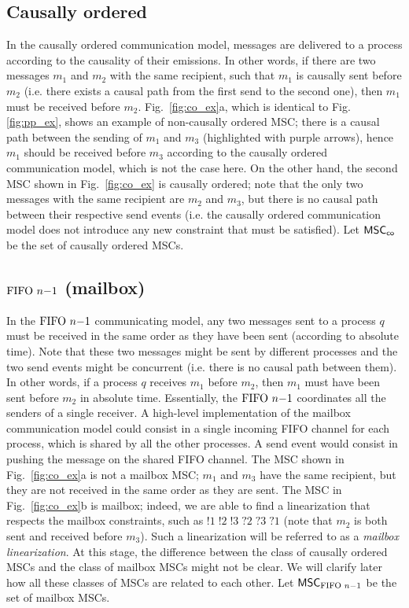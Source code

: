 \subsection{Causally ordered}
In the causally ordered communication model, messages are delivered to a process according to the causality of their emissions. In other words, if there are two messages $m_1$ and $m_2$ with the same recipient, such that $m_1$ is causally sent before $m_2$ (i.e. there exists a causal path from the first send to the second one), then $m_1$ must be received before $m_2$. Fig.~\ref{fig:co_ex}a, which is identical to Fig.\ref{fig:pp_ex}, shows an example of non-causally ordered MSC; there is a causal path between the sending of $m_1$ and $m_3$ (highlighted with purple arrows), hence $m_1$ should be received before $m_3$ according to the causally ordered communication model, which is not the case here. On the other hand, the second MSC shown in Fig.~\ref{fig:co_ex} is causally ordered; note that the only two messages with the same recipient are $m_2$ and $m_3$, but there is no causal path between their respective send events (i.e. the causally ordered communication model does not introduce any new constraint that must be satisfied). Let $\mathsf{MSC}_{\mathsf{co}}$ be the set of causally ordered MSCs.



\subsection{$\text{FIFO } n\mathsf{-}1$ (mailbox)}
In the $\text{FIFO } n\mathsf{-}1$ communicating model, any two messages sent to a process $q$ must be received in the same order as they have been sent (according to absolute time). Note that these two messages might be sent by different processes and the two send events might be concurrent (i.e. there is no causal path between them). In other words, if a process $q$ receives $m_1$ before $m_2$, then $m_1$ must have been sent before $m_2$ in absolute time. Essentially, the $\text{FIFO } n\mathsf{-}1$ coordinates all the senders of a single receiver. A high-level implementation of the mailbox communication model could consist in a single incoming FIFO channel for each process, which is shared by all the other processes. A send event would consist in pushing the message on the shared FIFO channel. The MSC shown in Fig.~\ref{fig:co_ex}a is not a mailbox MSC; $m_1$ and $m_3$ have the same recipient, but they are not received in the same order as they are sent. The MSC in Fig.~\ref{fig:co_ex}b is mailbox; indeed, we are able to find a linearization that respects the mailbox constraints, such as $!1\;!2\;!3\;?2\;?3\;?1$ (note that $m_2$ is both sent and received before $m_3$). Such a linearization will be referred to as a \emph{mailbox linearization}. At this stage, the difference between the class of causally ordered MSCs and the class of mailbox MSCs might not be clear. We will clarify later how all these classes of MSCs are related to each other. Let $\mathsf{MSC}_{\text{FIFO } n\mathsf{-}1}$ be the set of mailbox MSCs.

